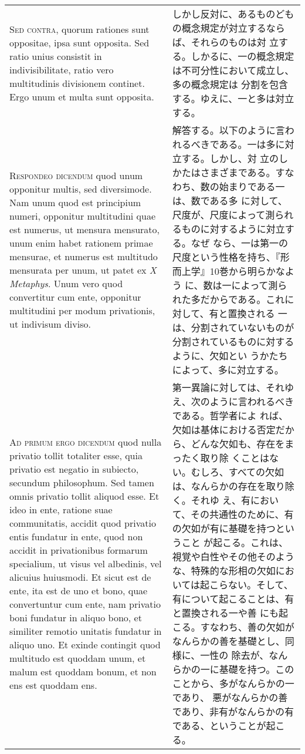 \documentclass[10pt]{jsarticle} %
\begin{document}
\begin{longtable}{p{21em}p{21em}}
\\

{\scshape Sed contra}, quorum rationes sunt oppositae, ipsa sunt opposita. Sed
ratio unius consistit in indivisibilitate, ratio vero multitudinis
divisionem continet. Ergo unum et multa sunt opposita.

&

しかし反対に、あるものどもの概念規定が対立するならば、それらのものは対
立する。しかるに、一の概念規定は不可分性において成立し、多の概念規定は
分割を包含する。ゆえに、一と多は対立する。



\\

{\scshape Respondeo dicendum} quod unum opponitur multis, sed diversimode. Nam unum
quod est principium numeri, opponitur multitudini quae est numerus, ut
mensura mensurato, unum enim habet rationem primae mensurae, et numerus
est multitudo mensurata per unum, ut patet ex {\it X Metaphys}. Unum vero quod
convertitur cum ente, opponitur multitudini per modum privationis, ut
indivisum diviso.

&

解答する。以下のように言われるべきである。一は多に対立する。しかし、対
立のしかたはさまざまである。すなわち、数の始まりである一は、数である多
に対して、尺度が、尺度によって測られるものに対するように対立する。なぜ
なら、一は第一の尺度という性格を持ち、『形而上学』10巻から明らかなよう
に、数は一によって測られた多だからである。これに対して、有と置換される
一は、分割されていないものが分割されているものに対するように、欠如とい
うかたちによって、多に対立する。




\\


{\scshape Ad primum ergo dicendum} quod nulla privatio tollit totaliter esse, quia
privatio est negatio in subiecto, secundum philosophum. Sed tamen omnis
privatio tollit aliquod esse. Et ideo in ente, ratione suae
communitatis, accidit quod privatio entis fundatur in ente, quod non
accidit in privationibus formarum specialium, ut visus vel albedinis,
vel alicuius huiusmodi. Et sicut est de ente, ita est de uno et bono,
quae convertuntur cum ente, nam privatio boni fundatur in aliquo bono,
et similiter remotio unitatis fundatur in aliquo uno. Et exinde
contingit quod multitudo est quoddam unum, et malum est quoddam bonum,
et non ens est quoddam ens. 

&

第一異論に対しては、それゆえ、次のように言われるべきである。哲学者によ
れば、欠如は基体における否定だから、どんな欠如も、存在をまったく取り除
くことはない。むしろ、すべての欠如は、なんらかの存在を取り除く。それゆ
え、有において、その共通性のために、有の欠如が有に基礎を持つということ
が起こる。これは、視覚や白性やその他そのような、特殊的な形相の欠如にお
いては起こらない。そして、有について起こることは、有と置換される一や善
にも起こる。すなわち、善の欠如がなんらかの善を基礎とし、同様に、一性の
除去が、なんらかの一に基礎を持つ。このことから、多がなんらかの一であり、
悪がなんらかの善であり、非有がなんらかの有である、ということが起こる。



\end{longtable}
\end{document}
